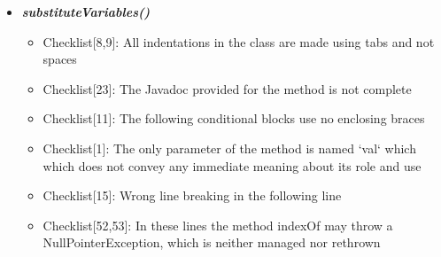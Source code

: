 \documentclass[11pt,titlepage]{article} %
\begin{document}
  \begin{itemize}
   \item \textbf{\textit{substituteVariables()}}
   \begin{itemize}
    \item Checklist[8,9]:  All indentations in the class are made using tabs and not spaces
    \item Checklist[23]: The Javadoc provided for the method is not complete
    \item Checklist[11]: The following conditional blocks use no enclosing braces
      
      
      
      

    \item Checklist[1]: The only parameter of the method is named `val` which  which does not convey any immediate meaning about its role and use

    \item Checklist[15]: Wrong line breaking in the following line
      

    \item Checklist[52,53]: In these lines the method indexOf may throw a NullPointerException, which is neither managed nor rethrown
      
      
      



\end{itemize}
\end{itemize}
\end{document}
